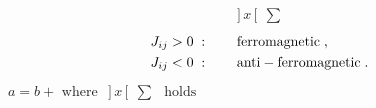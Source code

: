 \documentclass{article}
\begin{document}
\[\begin{gathered} ]\,x\,[\;\,\sum \end{gathered}\]
\begin{equation}\begin{split}&J_{ij}>0\;:\qquad{\rm ferromagnetic}\;,\\
&J_{ij}<0\;:\qquad{\rm anti-ferromagnetic}\;.\end{split}\end{equation}
$a=b+\mbox{ where $\begin{gathered}]\,x\,[\;\,\sum\end{gathered}$ holds}$
\end{document}
